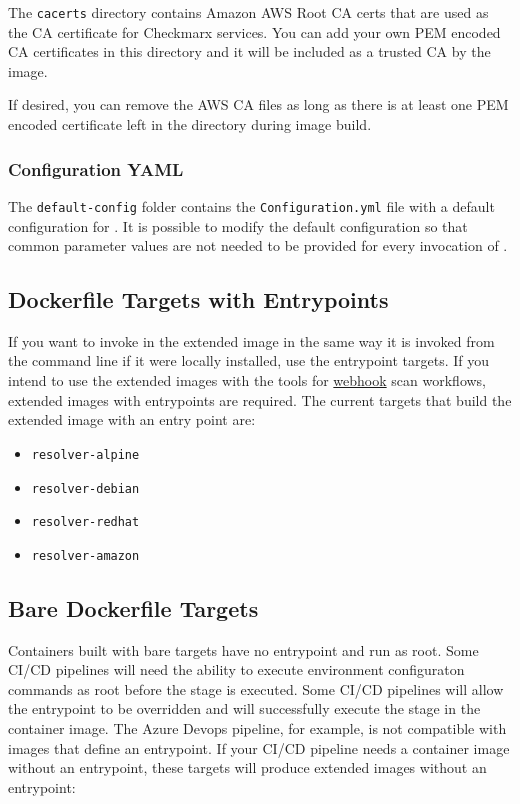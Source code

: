 The \texttt{cacerts} directory contains Amazon AWS Root CA certs that are used as the CA 
certificate for Checkmarx services.  You can add your own PEM encoded CA certificates in this
directory and it will be included as a trusted CA by the image.

If desired, you can remove the AWS CA files as long as there is at least one PEM
encoded certificate left in the directory during image build.

\subsubsection{\scaresolver Configuration YAML}

The \texttt{default-config} folder contains the \texttt{Configuration.yml} file with a default
configuration for \scaresolver.  It is possible to modify the default configuration so that
common parameter values are not needed to be provided for every invocation of \scaresolver.

\subsection{Dockerfile Targets with Entrypoints}\label{ssec:entrypoint_targets}

If you want to invoke \scaresolver in the extended image in the same way it is invoked from the command
line if it were locally installed, use the entrypoint targets.  If you intend to use the
extended images with the \cxtoolkit 
tools for \hyperref[chap:build_env_affinity]{webhook} scan workflows, extended
images with entrypoints are required.  The current targets that build the extended
image with an entry point are:

\begin{itemize}
    \item \texttt{resolver-alpine}
    \item \texttt{resolver-debian}
    \item \texttt{resolver-redhat}
    \item \texttt{resolver-amazon}
\end{itemize}


\subsection{Bare Dockerfile Targets}\label{ssec:bare_targets}

Containers built with bare targets have no entrypoint and run as root.  
Some CI/CD pipelines will need the ability to execute environment
configuraton commands as root before the stage is executed.  Some CI/CD pipelines
will allow the entrypoint to be overridden and will successfully execute the stage
in the container image.  The Azure Devops pipeline, for example, is not compatible
with images that define an entrypoint.  If your CI/CD pipeline needs a container image without 
an entrypoint, these targets will
produce extended images without an entrypoint:

